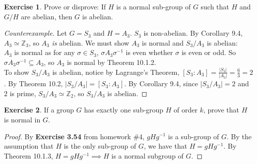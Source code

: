 \documentclass{article}
\theoremstyle{definition}
\newtheorem{theorem}{Exercise}[section]
\newcommand{\Z}{\mathbb{Z}}
\newcommand{\inv}[1]{#1^{-1}}
\begin{document}
	\setcounter{theorem}{6}
	\begin{theorem}
		Prove or disprove: If $H$ is a normal sub-group of $G$ such that $H$ and $G/H$ are abelian, then $G$ is abelian.
	\end{theorem}
	\begin{proof}[Counterexample]
		Let $G = S_3$ and $H = A_3$. $S_3$ is non-abelian. By Corollary 9.4, $A_3 \simeq \Z_3$, so $A_3$ \textit{is} abelian. We must show $A_3$ is normal and $S_3/A_3$ is abelian:\\
		$A_3$ is normal as for any $\sigma\in S_3$, $\sigma A_3 \inv{\sigma}$ is even whether $\sigma$ is even or odd. So $\sigma A_3 \inv{\sigma} \subseteq A_3$, so $A_3$ is normal by Theorem 10.1.2. \nolinebreak\checkmark\\
		To show $S_3/A_3$ is abelian, notice by Lagrange's Theorem, $\left[S_3 : A_3 \right] = \frac{|S_3|}{|A_3|} = \frac{6}{3} = 2$. By Theorem 10.2, $|S_3/A_3|=\left[S_3 : A_3 \right]$. By Corollary 9.4, since $|S_3/A_3|=2$ and $2$ is prime, $S_3/A_3 \simeq \Z_2$, so $S_3/A_3$ is abelian. \checkmark 
	\end{proof}

	\setcounter{theorem}{10}
	\begin{theorem}
		If a group $G$ has exactly one sub-group $H$ of order $k$, prove that $H$ is normal in $G$.
	\end{theorem}
	\begin{proof}
		By \textbf{Exercise 3.54} from homework \#4, $gH\inv{g}$ is a sub-group of $G$. By the assumption that $H$ is the only sub-group of $G$, we have that $H = gH\inv{g}$. By Theorem 10.1.3, $H = gH\inv{g}\implies H$ is a normal subgroup of $G$. 
	\end{proof}
\end{document}

